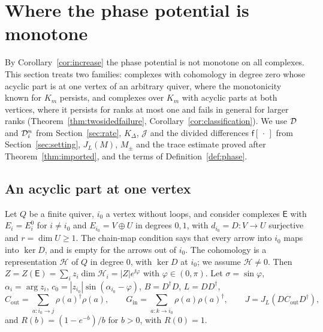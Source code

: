 \section{Where the phase potential is monotone}\label{sec:monotone}

By Corollary~\ref{cor:increase} the phase potential is not monotone on all
complexes. This section treats two families: complexes with cohomology in
degree zero whose acyclic part is at one vertex of an arbitrary quiver,
where the monotonicity known for $K_m$ \cite[Theorem~7.6]{wue26b} persists,
and complexes over $K_m$ with acyclic parts at both vertices, where it
persists for ranks at most one and fails in general for larger ranks
(Theorem~\ref{thm:twosidedfailure}, Corollary~\ref{cor:classification}). We
use $\mathcal D$ and $\mathcal D_i^n$ from Section~\ref{sec:rate}, $K_\Delta$, $\mathcal J$
and the divided differences $\mathsf f[\,\cdot\,]$ from
Section~\ref{sec:setting}, $J_L(M)$, $M_\pm$ and the trace estimate
proved after Theorem~\ref{thm:imported}, and the terms of
Definition~\ref{def:phase}.

\subsection{An acyclic part at one vertex}
Let $Q$ be a finite quiver, $i_0$ a vertex without loops, and consider
complexes $\mathsf E$ with $E_i=E_i^0$ for $i\neq i_0$ and
$E_{i_0}=V\oplus U$ in degrees $0,1$, with $d_{i_0}=D:V\to U$ surjective and
$r=\dim U\geq1$. The chain-map condition says that every arrow into $i_0$
maps into $\ker D$, and is empty for the arrows out of $i_0$. The cohomology
is a representation $\mathcal H$ of $Q$ in degree $0$, with $\ker D$ at $i_0$;
we assume $\mathcal H\neq0$. Then
$Z=Z(\mathsf E)=\sum_iz_i\dim\mathcal H_i=|Z|e^{\ii\varphi}$ with
$\varphi\in(0,\pi)$. Let $\sigma=\sin\varphi$, $\alpha_i=\arg z_i$,
$c_0=|z_{i_0}|\sin(\alpha_{i_0}-\varphi)$, $B=D^\dagger D$, $L=DD^\dagger$,
\[
 C_{\mathrm{out}}=\sum_{a:i_0\to j}\rho(a)^\dagger\rho(a),\qquad
 G_{\mathrm{in}}=\sum_{a:k\to i_0}\rho(a)\rho(a)^\dagger,\qquad
 J=J_L(DC_{\mathrm{out}}D^\dagger),
\]
and $R(b)=(1-e^{-b})/b$ for $b>0$, with $R(0)=1$.

